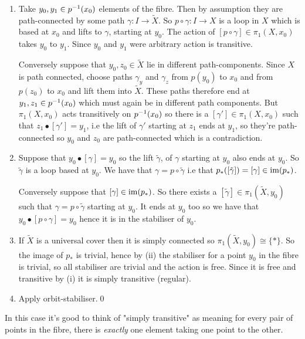 \documentclass{article}
\begin{document}
\begin{enumerate}
	\item Take $ y_0,y_1 \in {p}^{-1}(x_0) $ elements of the fibre. Then by assumption they are path-connected by some path $ \gamma: I \to \tilde X $. So $ p\circ \gamma: I \to X $ is a loop in $ X $ which is based at $ x_0 $ and lifts to $ \gamma $, starting at $ y_0 $. The action of $ [p\circ \gamma] \in \pi_1(X,x_0) $ takes $ y_0 $ to $ y_1 $. Since $ y_0 $ and $ y_1 $ were arbitrary action is transitive.\par
		Conversely suppose that $ y_0,z_0\in \tilde X $ lie in different path-components. Since $ X $ is path connected, choose paths $ \gamma_y $ and $ \gamma_z $ from $ p(y_0) $ to $ x_0 $ and from $ p(z_0) $ to $ x_0 $ and lift them into $ \tilde X $. These paths therefore end at $ y_1,z_1\in {p}^{-1}(x_0) $ which  must again be in different path components. But $ \pi_1(X,x_0) $ acts transitively on $ {p}^{-1}(x_0) $ so there is a $ [\gamma']\in \pi_1(X,x_0) $ such that $ z_1\bullet [\gamma'] = y_1 $, i.e the lift of $ \gamma' $ starting at $ z_1 $ ends at $ y_1 $, so they're path-connected so $ y_0 $ and $ z_0 $ are path-connected which is a contradiction. 
	\item Suppose that $ y_0 \bullet [\gamma] = y_0 $ so the lift $ \tilde\gamma $, of $ \gamma $ starting at $ y_0 $ also ends at $ y_0 $. So $ \tilde \gamma $ is a loop based at $ y_0 $. We have that $ \gamma = p \circ \tilde \gamma $ i.e that $ p_*([\tilde\gamma]) = [\gamma]\in \operatorname{im}(p_*) $.
		\par Conversely suppose that $ [\gamma]\in \operatorname{im}(p_*) $. So there exists a $ [\tilde \gamma] \in \pi_1(\tilde X,y_0) $ such that $ \gamma = p \circ \tilde \gamma $ starting at $ y_0 $. It ends at $ y_0 $ too so we have that $ y_0\bullet [p\circ\gamma] = y_0 $ hence it is in the stabiliser of $ y_0 $.
	\item If $ \tilde X $ is a universal cover then it is simply connected so $ \pi_1(\tilde X,y_0) \cong \{*\} $. So the image of $ p_* $ is trivial, hence by (ii) the stabiliser for a point $ y_0 $ in the fibre is trivial, so all stabiliser are trivial and the action is free. Since it is free and transitive by (i) it is simply transitive (regular).
	\item Apply orbit-stabiliser.\qed
\end{enumerate}
\begin{remark}
	In this case it's good to think of "simply transitive" as meaning for every pair of points in the fibre, there is \textit{exactly} one element taking one point to the other.
\end{remark}
\end{document}
